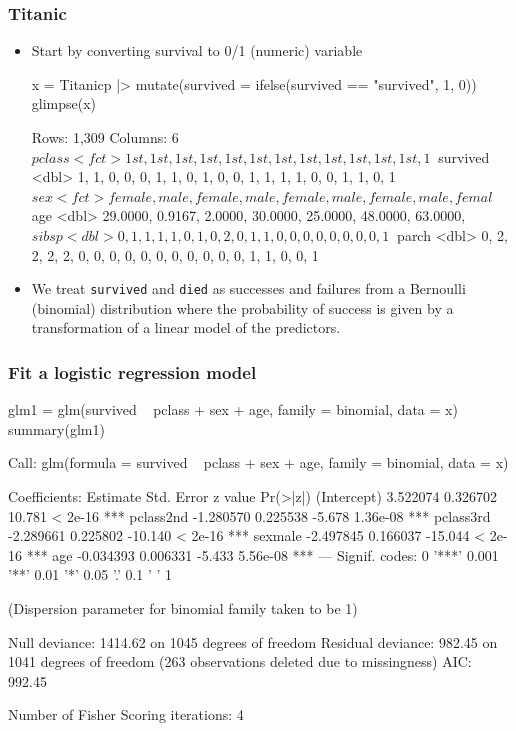 \documentclass[a4paper]{article}\usepackage[]{graphicx}\usepackage[]{xcolor}
\begin{document}
\subsubsection{Titanic}
\begin{itemize}
	\item Start by converting survival to 0/1 (numeric) variable
\begin{Schunk}
\begin{Sinput}
x = Titanicp |> mutate(survived = ifelse(survived == "survived", 1, 0))
glimpse(x)
\end{Sinput}
\begin{Soutput}
Rows: 1,309
Columns: 6
$ pclass   <fct> 1st, 1st, 1st, 1st, 1st, 1st, 1st, 1st, 1st, 1st, 1st, 1st, 1~
$ survived <dbl> 1, 1, 0, 0, 0, 1, 1, 0, 1, 0, 0, 1, 1, 1, 1, 0, 0, 1, 1, 0, 1~
$ sex      <fct> female, male, female, male, female, male, female, male, femal~
$ age      <dbl> 29.0000, 0.9167, 2.0000, 30.0000, 25.0000, 48.0000, 63.0000, ~
$ sibsp    <dbl> 0, 1, 1, 1, 1, 0, 1, 0, 2, 0, 1, 1, 0, 0, 0, 0, 0, 0, 0, 0, 1~
$ parch    <dbl> 0, 2, 2, 2, 2, 0, 0, 0, 0, 0, 0, 0, 0, 0, 0, 0, 1, 1, 0, 0, 1~
\end{Soutput}
\end{Schunk}
	\item We treat \lstinline|survived| and \lstinline|died| as successes and failures from a Bernoulli (binomial) distribution where the probability of success is given by a transformation of a linear model of the predictors.
\end{itemize}
\subsubsection{Fit a logistic regression model}
\begin{Schunk}
\begin{Sinput}
glm1 = glm(survived ~ pclass + sex + age, family = binomial, data = x)
summary(glm1)
\end{Sinput}
\begin{Soutput}

Call:
glm(formula = survived ~ pclass + sex + age, family = binomial, 
    data = x)

Coefficients:
             Estimate Std. Error z value Pr(>|z|)    
(Intercept)  3.522074   0.326702  10.781  < 2e-16 ***
pclass2nd   -1.280570   0.225538  -5.678 1.36e-08 ***
pclass3rd   -2.289661   0.225802 -10.140  < 2e-16 ***
sexmale     -2.497845   0.166037 -15.044  < 2e-16 ***
age         -0.034393   0.006331  -5.433 5.56e-08 ***
---
Signif. codes:  0 '***' 0.001 '**' 0.01 '*' 0.05 '.' 0.1 ' ' 1

(Dispersion parameter for binomial family taken to be 1)

    Null deviance: 1414.62  on 1045  degrees of freedom
Residual deviance:  982.45  on 1041  degrees of freedom
  (263 observations deleted due to missingness)
AIC: 992.45

Number of Fisher Scoring iterations: 4
\end{Soutput}
\end{Schunk}
\end{document}
